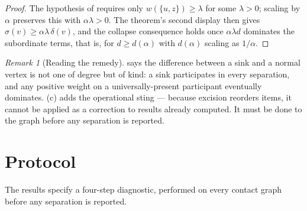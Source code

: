 \documentclass[11pt,a4paper]{article}
\theoremstyle{definition}
\theoremstyle{remark}
\newtheorem{remark}[theorem]{Remark}
\newcommand{\wt}{w}
\newcommand{\sep}{\sigma}
\newcommand{\dep}{\delta}
\begin{document}
\begin{proof}
The hypothesis of  requires only
$\wt(\{u,z\}) \geq \lambda$ for some $\lambda>0$; scaling by $\alpha$
preserves this with $\alpha\lambda>0$. The theorem's second display then
gives $\sep(v) \geq \alpha\lambda\,\dep(v)$, and the collapse consequence
holds once $\alpha\lambda d$ dominates the subordinate terms, that is,
for $d \geq d(\alpha)$ with $d(\alpha)$ scaling as $1/\alpha$.
\end{proof}

\begin{remark}[Reading the remedy]\label{rem:remedy}
 says the difference between a sink and a
normal vertex is not one of degree but of kind: a sink participates in
every separation, and any positive weight on a universally-present
participant eventually dominates. (c) adds the
operational sting --- because excision reorders items, it cannot be
applied as a correction to results already computed. It must be done to
the graph before any separation is reported.
\end{remark}

\section{Protocol}
\label{sec:protocol}

The results specify a four-step diagnostic, performed on every contact
graph before any separation is reported.
\end{document}
